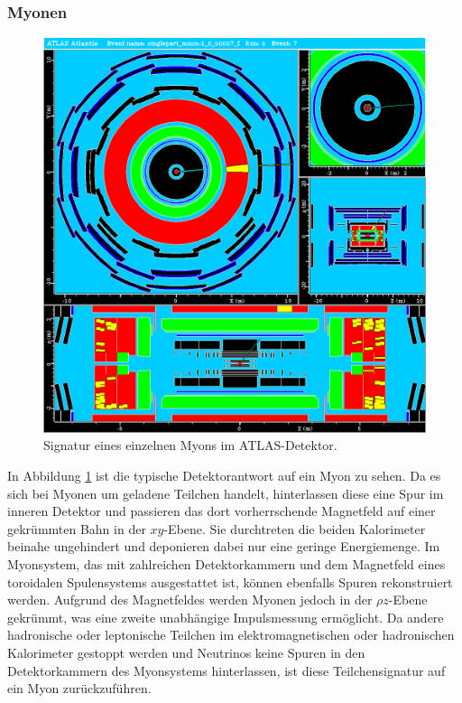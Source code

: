 \documentclass[11pt, a4paper]{article}
\numberwithin{equation}{section}
\begin{document}
\subsubsection{Myonen}
\begin{figure}[htbp]
	\centering
	\includegraphics[width=1.0\textwidth]{./data/atlantis/singlepart_events_new/muon/single_track2.png}
	\caption{Signatur eines einzelnen Myons im ATLAS-Detektor.}
	\label{fig:myon-singletrack}
\end{figure}
\vfill
\noindent
In Abbildung \ref{fig:myon-singletrack} ist die typische Detektorantwort auf ein Myon zu sehen.
Da es sich bei Myonen um geladene Teilchen handelt, hinterlassen diese eine Spur im inneren Detektor und passieren das dort vorherrschende Magnetfeld auf einer gekrümmten Bahn in der $xy$-Ebene.
Sie durchtreten die beiden Kalorimeter beinahe ungehindert und deponieren dabei nur eine geringe Energiemenge.
Im Myonsystem, das mit zahlreichen Detektorkammern und dem Magnetfeld eines toroidalen Spulensystems ausgestattet ist, können ebenfalls Spuren rekonstruiert werden.
Aufgrund des Magnetfeldes werden Myonen jedoch in der $\rho z$-Ebene gekrümmt, was eine zweite unabhängige Impulsmessung ermöglicht.
Da andere hadronische oder leptonische Teilchen im elektromagnetischen oder hadronischen Kalorimeter gestoppt werden und Neutrinos keine Spuren in den Detektorkammern des Myonsystems hinterlassen, ist diese Teilchensignatur auf ein Myon zurückzuführen. 
\vfill
\end{document}
